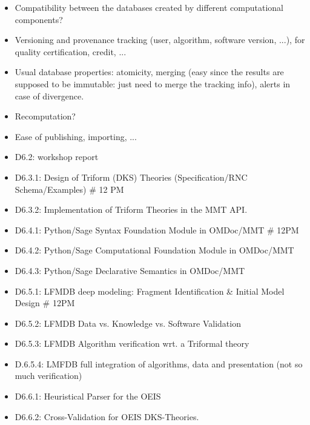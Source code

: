 \begin{Workpackage}{\thewpno}
\begin{WPDeliverables}
\begin{itemize}
\begin{itemize}
  \item Compatibility between the databases created by different
    computational components?
  \item Versioning and provenance tracking (user, algorithm, software
    version, ...), for quality certification, credit, ...
  \item Usual database properties: atomicity, merging (easy since the
    results are supposed to be immutable: just need to merge the
    tracking info), alerts in case of divergence.
  \item Recomputation?
  \item Ease of publishing, importing, ...
  \end{itemize}
\end{itemize}

\begin{itemize}
\item D6.2: workshop report
\item D6.3.1: Design of Triform (DKS) Theories (Specification/RNC Schema/Examples)          \# 12 PM
\item D6.3.2: Implementation of Triform Theories in the MMT API. 

\item D6.4.1: Python/Sage Syntax Foundation Module in OMDoc/MMT                                   \# 12PM
\item D6.4.2: Python/Sage Computational Foundation Module in OMDoc/MMT
\item D6.4.3: Python/Sage Declarative Semantics in OMDoc/MMT

\item D6.5.1: LFMDB deep modeling: Fragment Identification \& Initial Model Design              \# 12PM
\item D6.5.2: LFMDB Data vs. Knowledge vs. Software Validation
\item D6.5.3: LFMDB Algorithm verification wrt. a Triformal theory
\item D.6.5.4: LMFDB full integration of algorithms, data and presentation (not so much verification)

\item D6.6.1: Heuristical Parser for the OEIS
\item D6.6.2: Cross-Validation for OEIS DKS-Theories.
\end{itemize}
\end{WPDeliverables}
\begin{verbatim}


\end{verbatim}
\end{Workpackage}
